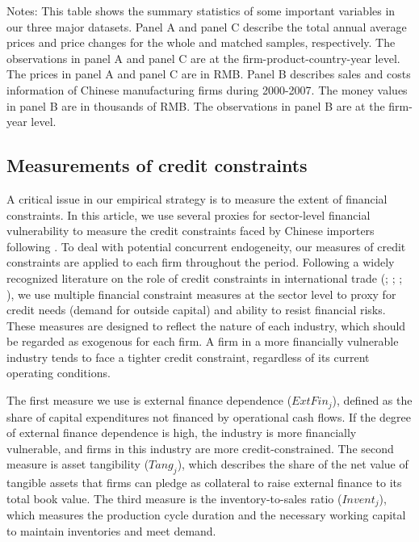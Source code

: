 \begin{table}[H]
{\begin{threeparttable}
	\begin{tablenotes}
		\footnotesize
		\item[Notes:] This table shows the summary statistics of some important variables in our three major datasets. Panel A and panel C describe the total annual average prices and price changes for the whole and matched samples, respectively. The observations in panel A and panel C are at the firm-product-country-year level. The prices in panel A and panel C are in RMB. Panel B describes sales and costs information of Chinese manufacturing firms during 2000-2007. The money values in panel B are in thousands of RMB. The observations in panel B are at the firm-year level.
	\end{tablenotes}
	\end{threeparttable}
        }
\end{table}

\subsection{Measurements of credit constraints} \label{Measurements-Credit Constraints}

A critical issue in our empirical strategy is to measure the extent of financial constraints. In this article, we use several proxies for sector-level financial vulnerability to measure the credit constraints faced by Chinese importers following \cite{manova2013}. To deal with potential concurrent endogeneity, our measures of credit constraints are applied to each firm throughout the period. Following a widely recognized literature on the role of credit constraints in international trade (\cite{kroszner2007}; \cite{manova2013}; \cite{manova-wei-zhang2015}; \cite{fan-lai-li2015}), we use multiple financial constraint measures at the sector level to proxy for credit needs (demand for outside capital) and ability to resist financial risks. These measures are designed to reflect the nature of each industry, which should be regarded as exogenous for each firm. A firm in a more financially vulnerable industry tends to face a tighter credit constraint, regardless of its current operating conditions.

The first measure we use is external finance dependence ($ExtFin_j$), defined as the share of capital expenditures not financed by operational cash flows. If the degree of external finance dependence is high, the industry is more financially vulnerable, and firms in this industry are more credit-constrained. The second measure is asset tangibility ($Tang_j$), which describes the share of the net value of tangible assets that firms can pledge as collateral to raise external finance to its total book value. The third measure is the inventory-to-sales ratio ($Invent_j$), which measures the production cycle duration and the necessary working capital to maintain inventories and meet demand. 

